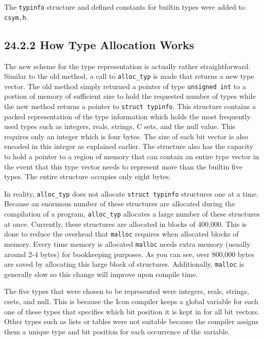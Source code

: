 The \texttt{typinfo} structure and defined constants for builtin types
were added to \texttt{csym.h}.

\subsection[24.2.2 How Type Allocation Works]{24.2.2 How Type Allocation Works}

The new scheme for the type representation is actually rather
straightforward. Similar to the old method, a call to
\texttt{alloc\_typ} is made that returns a new type vector. The old
method simply returned a pointer of type \texttt{unsigned int} to a
portion of memory of sufficient size to hold the requested number of
types while the new method returns a pointer to \texttt{struct
typinfo}. This structure contains a packed representation of the type
information which holds the most frequently used types such as
integers, reals, strings, C sets, and the null value. This requires
only an integer which is four bytes. The size of each bit vector is
also encoded in this integer as explained earlier. The structure also
has the capacity to hold a pointer to a region of memory that can
contain an entire type vector in the event that this type vector needs
to represent more than the builtin five types. The entire structure
occupies only eight bytes.

In reality, \texttt{alloc\_typ} does not allocate \texttt{struct
typinfo} structures one at a time. Because an enormous number of these
structures are allocated during the compilation of a program,
\texttt{alloc\_typ} allocates a large number of these structures at
once. Currently, these structures are allocated in blocks of
400,000. This is done to reduce the overhead that \texttt{malloc}
requires when allocated blocks of memory. Every time memory is
allocated \texttt{malloc} needs extra memory (usually around 2-4
bytes) for bookkeeping purposes. As you can see, over 800,000 bytes
are saved by allocating this large block of structures. Additionally,
\texttt{malloc} is generally slow so this change will improve upon
compile time.

The five types that were chosen to be represented were integers,
reals, strings, csets, and null. This is because the Icon compiler
keeps a global variable for each one of these types that specifies
which bit position it is kept in for all bit vectors. Other types such
as lists or tables were not suitable because the compiler assigns them
a unique type and bit position for each occurrence of the variable.

